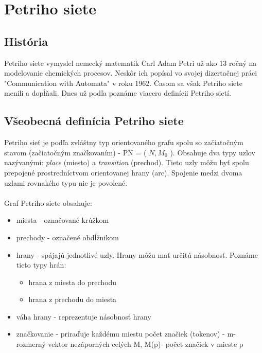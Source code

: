 





\section{Petriho siete}


\subsection{História}
Petriho siete vymyslel nemecký matematik Carl Adam Petri už ako 13 ročný na modelovanie chemických procesov. Neskôr ich popísal vo svojej dizertačnej práci "Communication with Automata" \cite{petri} v roku 1962. Časom sa však Petriho siete menili a dopĺňali. Dnes už podľa \cite{gabova_kniha} poznáme viacero definícii Petriho sietí. 


\subsection{Všeobecná definícia Petriho siete}
Petriho sieť je podľa 
\cite{desel}
 zvláštny typ orientovaného grafu spolu so začiatočným stavom (začiatočným značkovaním) - PN = ( $N, M_{0}$ ). 
Obsahuje dva typy uzlov nazývanými: \emph{place}  (miesto) a \emph{transition} (prechod). Tieto uzly môžu byť spolu prepojené prostredníctvom orientovanej hrany (arc). Spojenie medzi dvoma uzlami rovnakého typu nie je povolené.
\\
\\
Graf Petriho siete obsahuje: 
\begin{itemize}
	\item miesta - označované krúžkom 
	\item prechody - označené obdĺžnikom
	\item hrany - spájajú jednotlivé uzly. Hrany môžu mať určitú násobnosť. Poznáme tieto typy hrán: 
		\begin{itemize}
			\item hrana z miesta do prechodu
			\item hrana z prechodu do miesta
		\end{itemize}
	\item váha hrany - reprezentuje násobnosť hrany
	\item značkovanie - priraďuje každému miestu počet značiek (tokenov) - m-rozmerný vektor nezáporných celých M, M(p)- počet značiek v mieste p 
\end{itemize}

